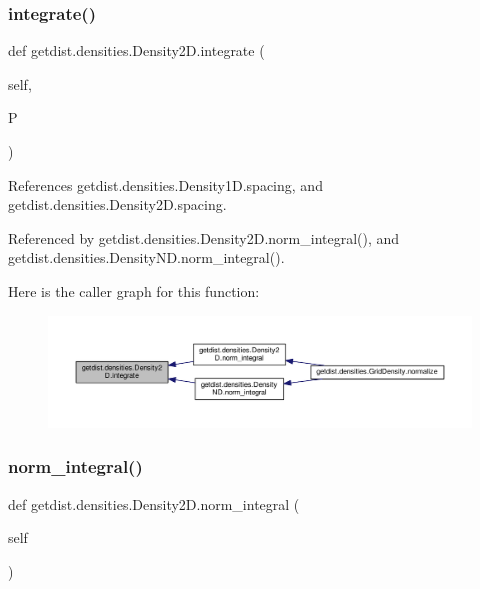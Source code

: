 \subsubsection{\texorpdfstring{integrate()}{integrate()}}
{\footnotesize\ttfamily def getdist.\+densities.\+Density2\+D.\+integrate (\begin{DoxyParamCaption}\item[{}]{self,  }\item[{}]{P }\end{DoxyParamCaption})}



References getdist.\+densities.\+Density1\+D.\+spacing, and getdist.\+densities.\+Density2\+D.\+spacing.



Referenced by getdist.\+densities.\+Density2\+D.\+norm\+\_\+integral(), and getdist.\+densities.\+Density\+N\+D.\+norm\+\_\+integral().

Here is the caller graph for this function\+:
\nopagebreak
\begin{figure}[H]
\begin{center}
\leavevmode
\includegraphics[width=350pt]{classgetdist_1_1densities_1_1Density2D_a1867261071c004cd1b4b438a627a0264_icgraph}
\end{center}
\end{figure}
\mbox{\label{classgetdist_1_1densities_1_1Density2D_a626cf46833a5a5df4fdb42a0b7d2510c}} 
\subsubsection{\texorpdfstring{norm\+\_\+integral()}{norm\_integral()}}
{\footnotesize\ttfamily def getdist.\+densities.\+Density2\+D.\+norm\+\_\+integral (\begin{DoxyParamCaption}\item[{}]{self }\end{DoxyParamCaption})}



